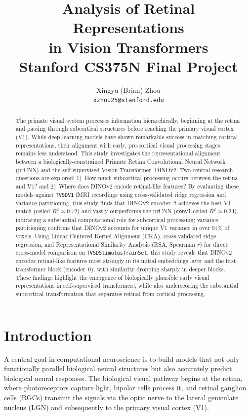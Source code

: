 \documentclass{article}
\title{
  Analysis of Retinal Representations\\in Vision Transformers\\
  \vspace{1em}
  \small{\normalfont Stanford CS375N Final Project}
}
\author{
  Xingyu (Brian) Zhou \\
  \texttt{xzhou25@stanford.edu}
}
\begin{document}
\maketitle

\begin{abstract}
The primate visual system processes information hierarchically, beginning at
the retina and passing through subcortical structures before reaching the
primary visual cortex (V1). While deep learning models have shown remarkable
success in matching cortical representations, their alignment with early,
pre-cortical visual processing stages remains less understood. This study
investigates the representational alignment between a biologically-constrained
Primate Retina Convolutional Neural Network (prCNN) and the self-supervised
Vision Transformer, DINOv2. Two central research questions are explored:
1)~How much subcortical processing occurs between the retina and V1? and
2)~Where does DINOv2 encode retinal-like features? By evaluating these models
against \texttt{TVSDV1} fMRI recordings using cross-validated ridge regression
and variance partitioning, this study finds that DINOv2 encoder~2 achieves the
best V1 match (ceiled $R^2 \approx 0.72$) and vastly outperforms the prCNN
(\texttt{conv1} ceiled $R^2 \approx 0.24$), indicating a substantial
computational role for subcortical processing; variance partitioning confirms
that DINOv2 accounts for unique V1 variance in over 91\% of voxels.
Using Linear Centered Kernel Alignment (CKA), cross-validated ridge regression,
and Representational Similarity Analysis (RSA, Spearman $r$) for direct
cross-model comparison on \texttt{TVSDStimulusTrainSet}, this study reveals
that DINOv2 encodes retinal-like features most strongly in its initial
embeddings layer and the first transformer block (encoder~0), with similarity
dropping sharply in deeper blocks. These findings highlight the emergence of
biologically plausible early visual representations in self-supervised
transformers, while also underscoring the substantial subcortical transformation
that separates retinal from cortical processing.
\end{abstract}

\section{Introduction}
A central goal in computational neuroscience is to build models that not only
functionally parallel biological neural structures but also accurately
predict biological neural responses. The biological visual
pathway begins at the retina, where photoreceptors capture light, bipolar
cells process it, and retinal ganglion cells (RGCs) transmit the signals via
the optic nerve to the lateral geniculate nucleus (LGN) and subsequently to
the primary visual cortex (V1).
\end{document}
